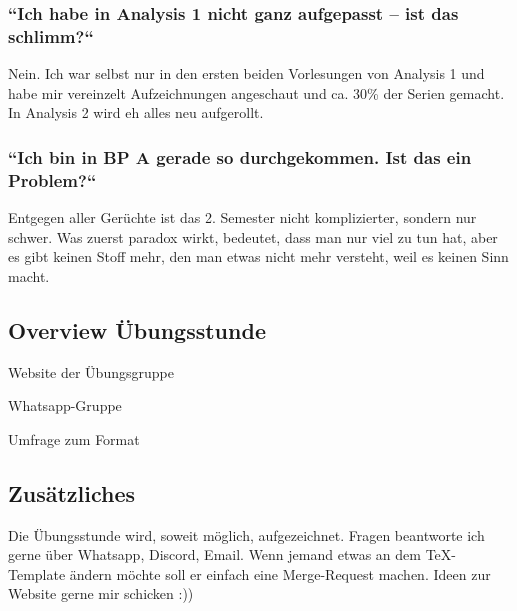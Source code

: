 \documentclass[11pt,a4paper]{article}
\begin{document}
\subsubsection{``Ich habe in Analysis 1 nicht ganz aufgepasst – ist das schlimm{?}``}
Nein. Ich war selbst nur in den ersten beiden Vorlesungen von Analysis 1 und habe mir vereinzelt Aufzeichnungen angeschaut und ca. 30\% der Serien gemacht. In Analysis 2 wird eh alles neu aufgerollt.

\subsubsection{``Ich bin in BP A gerade so durchgekommen. Ist das ein Problem{?}``}
Entgegen aller Gerüchte ist das 2. Semester nicht komplizierter, sondern nur schwer. Was zuerst paradox wirkt, bedeutet, dass man nur viel zu tun hat, aber es gibt keinen Stoff mehr, den man etwas nicht mehr versteht, weil es keinen Sinn macht.

\subsection{Overview Übungsstunde}
\centering

\begin{minipage}{0.8\linewidth}
    Website der Übungsgruppe
    \hfill  
\end{minipage}

\vfill %
\begin{minipage}{0.8\linewidth}  
    Whatsapp-Gruppe
    \hfill  
\end{minipage}
\vfill
\begin{minipage}{0.8\linewidth}
    Umfrage zum Format
    \hfill  
\end{minipage}

\raggedright
\subsection{Zusätzliches}
Die Übungsstunde wird, soweit möglich, aufgezeichnet. Fragen beantworte ich gerne über Whatsapp, Discord, Email. Wenn jemand etwas an dem TeX-Template ändern möchte soll er einfach eine Merge-Request machen. Ideen zur Website gerne mir schicken :))
\newpage
\end{document}
